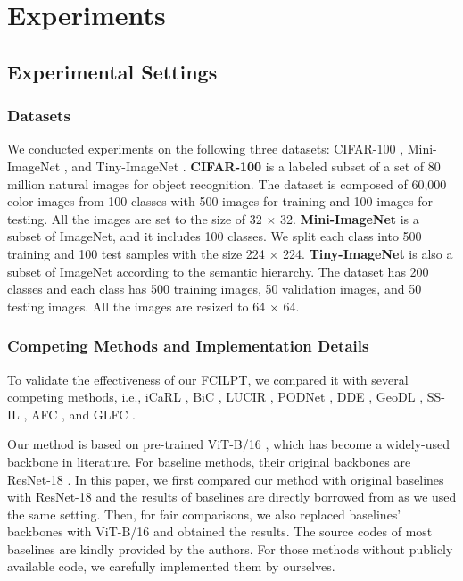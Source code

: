 \documentclass[sigconf,anonymous,review,screen]{acmart}
\begin{document}
\section{Experiments}
\subsection{Experimental Settings}
\subsubsection{Datasets} 
We conducted experiments on the following three datasets: CIFAR-100 \cite{krizhevsky2009learning}, Mini-ImageNet \cite{deng2009imagenet}, and Tiny-ImageNet \cite{le2015tiny}.
\textbf{CIFAR-100} is a labeled subset of a set of 80 million natural images for object recognition. The dataset is composed of 60,000 color images from 100 classes with 500 images for training and 100 images for testing. All the images are set to the size of 32 $\times$ 32. \textbf{Mini-ImageNet}  is a subset of ImageNet, and it includes 100 classes. We split each class into 500 training and 100 test samples with the size 224 $\times$ 224. \textbf{Tiny-ImageNet} is also a subset of ImageNet according to the semantic hierarchy. The dataset has 200 classes and each class has 500 training images, 50 validation images, and 50 testing images. All the images are resized to 64 $\times$ 64. 



\subsubsection{Competing Methods and Implementation Details}
To validate the effectiveness of our FCILPT, we compared it with several competing methods, i.e., iCaRL \cite{rebuffi2017icarl}, BiC \cite{wu2019large}, LUCIR \cite{hou2019learning}, PODNet \cite{douillard2020podnet}, DDE \cite{hu2021distilling}, GeoDL \cite{simon2021learning}, SS-IL \cite{ahn2021ss}, AFC \cite{kang2022class}, and GLFC \cite{dong2022federated}. 

Our method is based on pre-trained ViT-B/16 \cite{dosovitskiyimage, zhang2022nested}, which has become a widely-used backbone in literature. For baseline methods, their original backbones are ResNet-18 \cite{he2016deep}. In this paper, we first compared our method with original baselines with ResNet-18 and the results of baselines are directly borrowed from \cite{dong2022federated} as we used the same setting. Then, for fair comparisons, we also replaced baselines' backbones with ViT-B/16 and obtained the results. The source codes of most baselines are kindly provided by the authors. For those methods without publicly available code, we carefully implemented them by ourselves.
\end{document}
